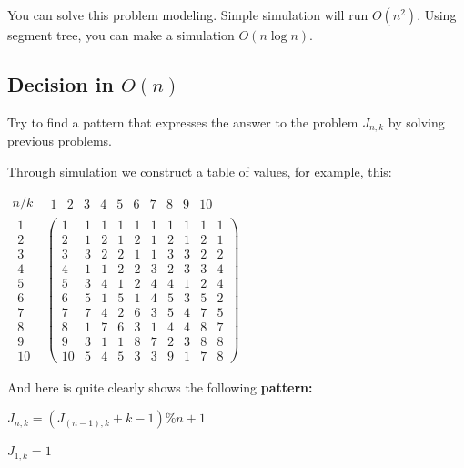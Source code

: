 You can solve this problem modeling. Simple simulation will run $O (n ^ 2)$. Using segment tree, you can make a simulation $O (n \log n)$.

\subsection{ Decision in $O (n)$}

Try to find a pattern that expresses the answer to the problem $J_ {n, k}$ by solving previous problems.

Through simulation we construct a table of values, for example, this:

$\begin{array}{cc}
n/k & \begin{array}{cccccccccc}
1 & 2 & 3 & 4 & 5 & 6 & 7 & 8 & 9 & 10\end{array}\\
\begin{array}{c}
1\\
2\\
3\\
4\\
5\\
6\\
7\\
8\\
9\\
10
\end{array} & \begin{pmatrix}1 & 1 & 1 & 1 & 1 & 1 & 1 & 1 & 1 & 1\\
2 & 1 & 2 & 1 & 2 & 1 & 2 & 1 & 2 & 1\\
3 & 3 & 2 & 2 & 1 & 1 & 3 & 3 & 2 & 2\\
4 & 1 & 1 & 2 & 2 & 3 & 2 & 3 & 3 & 4\\
5 & 3 & 4 & 1 & 2 & 4 & 4 & 1 & 2 & 4\\
6 & 5 & 1 & 5 & 1 & 4 & 5 & 3 & 5 & 2\\
7 & 7 & 4 & 2 & 6 & 3 & 5 & 4 & 7 & 5\\
8 & 1 & 7 & 6 & 3 & 1 & 4 & 4 & 8 & 7\\
9 & 3 & 1 & 1 & 8 & 7 & 2 & 3 & 8 & 8\\
10 & 5 & 4 & 5 & 3 & 3 & 9 & 1 & 7 & 8
\end{pmatrix}
\end{array}$

And here is quite clearly shows the following \textbf{pattern:}

$J_{n,k}=(J_{(n-1),k}+k-1)\%n+1$

$J_ {1, k} = 1$

